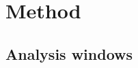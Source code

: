 \documentclass[11pt,a4paper]{article}
\newcommand{\E}{\mathbb{E}}
\theoremstyle{plain}
\newtheorem{proposition}{Proposition}
\newtheorem{corollary}{Corollary}
\theoremstyle{remark}
\begin{document}




\section{Method}
\label{sec:method}

\subsection{Analysis windows}
\end{document}
